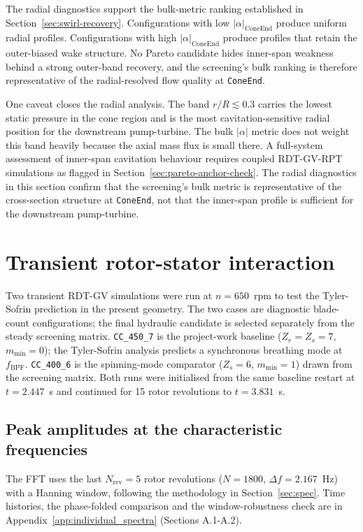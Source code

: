 The radial diagnostics support the bulk-metric ranking established in Section~\ref{sec:swirl-recovery}. Configurations with low $|\alpha|_{\mathrm{ConeEnd}}$ produce uniform radial profiles. Configurations with high $|\alpha|_{\mathrm{ConeEnd}}$ produce profiles that retain the outer-biased wake structure. No Pareto candidate hides inner-span weakness behind a strong outer-band recovery, and the screening's bulk ranking is therefore representative of the radial-resolved flow quality at \texttt{ConeEnd}.

One caveat closes the radial analysis. The band $r/R \lesssim 0.3$ carries the lowest static pressure in the cone region and is the most cavitation-sensitive radial position for the downstream pump-turbine. The bulk $|\alpha|$ metric does not weight this band heavily because the axial mass flux is small there. A full-system assessment of inner-span cavitation behaviour requires coupled RDT-GV-RPT simulations as flagged in Section~\ref{sec:pareto-anchor-check}. The radial diagnostics in this section confirm that the screening's bulk metric is representative of the cross-section structure at \texttt{ConeEnd}, not that the inner-span profile is sufficient for the downstream pump-turbine.

\section{Transient rotor-stator interaction}
\label{sec:results-fft}
 
Two transient RDT-GV simulations were run at $n = 650$~rpm to test the Tyler-Sofrin prediction in the present geometry. The two cases are diagnostic blade-count configurations; the final hydraulic candidate is selected separately from the steady screening matrix. \texttt{CC\_450\_7} is the project-work baseline ($Z_r = Z_s = 7$, $m_{\min} = 0$); the Tyler-Sofrin analysis predicts a synchronous breathing mode at $f_{\mathrm{BPF}}$. \texttt{CC\_400\_6} is the spinning-mode comparator ($Z_s = 6$, $m_{\min} = 1$) drawn from the screening matrix. Both runs were initialised from the same baseline restart at $t = 2.447$~s and continued for 15 rotor revolutions to $t = 3.831$~s.
\subsection{Peak amplitudes at the characteristic frequencies}
\label{sec:results-peaks}
 
The FFT uses the last $N_{\mathrm{rev}} = 5$ rotor revolutions ($N = 1800$, $\Delta f = 2.167$~Hz) with a Hanning window, following the methodology in Section~\ref{sec:spec}. Time histories, the phase-folded comparison and the window-robustness check are in Appendix~\ref{app:individual_spectra} (Sections A.1-A.2).
 
